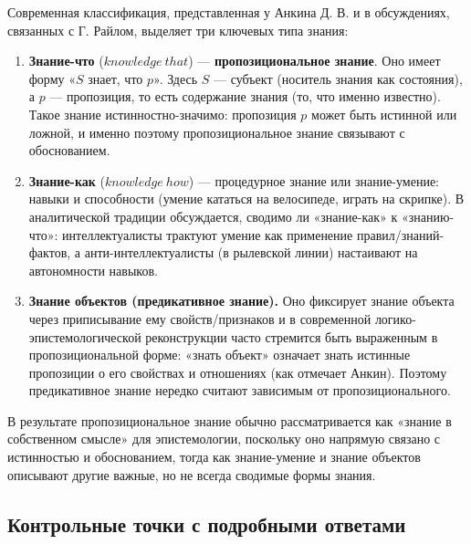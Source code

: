 \documentclass[a4paper,12pt]{article}
\begin{document}
Современная классификация, представленная у Анкина Д. В. и в обсуждениях, связанных с Г. Райлом, выделяет три ключевых типа знания:
\begin{enumerate}
    \item \textbf{Знание-что} ($knowledge\ that$) --- \textbf{пропозициональное знание}. Оно имеет форму «$S$ знает, что $p$». Здесь $S$ --- субъект (носитель знания как состояния), а $p$ --- пропозиция, то есть содержание знания (то, что именно известно). Такое знание истинностно-значимо: пропозиция $p$ может быть истинной или ложной, и именно поэтому пропозициональное знание связывают с обоснованием.
    \item \textbf{Знание-как} ($knowledge\ how$) --- процедурное знание или знание-умение: навыки и способности (умение кататься на велосипеде, играть на скрипке). В аналитической традиции обсуждается, сводимо ли «знание-как» к «знанию-что»: интеллектуалисты трактуют умение как применение правил/знаний-фактов, а анти-интеллектуалисты (в рылевской линии) настаивают на автономности навыков.
    \item \textbf{Знание объектов (предикативное знание).} Оно фиксирует знание объекта через приписывание ему свойств/признаков и в современной логико-эпистемологической реконструкции часто стремится быть выраженным в пропозициональной форме: «знать объект» означает знать истинные пропозиции о его свойствах и отношениях (как отмечает Анкин). Поэтому предикативное знание нередко считают зависимым от пропозиционального.
\end{enumerate}

В результате пропозициональное знание обычно рассматривается как «знание в собственном смысле» для эпистемологии, поскольку оно напрямую связано с истинностью и обоснованием, тогда как знание-умение и знание объектов описывают другие важные, но не всегда сводимые формы знания.

\subsection{Контрольные точки с подробными ответами}
\end{document}
